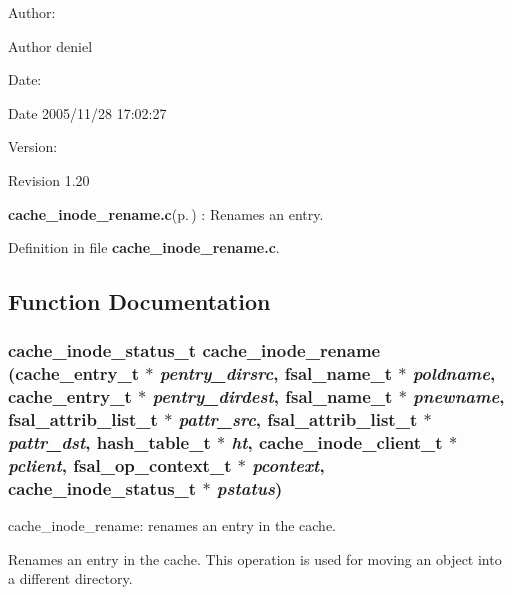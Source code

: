\begin{Desc}
\item[Author:]\begin{Desc}
\item[Author]deniel \end{Desc}
\end{Desc}
\begin{Desc}
\item[Date:]\begin{Desc}
\item[Date]2005/11/28 17:02:27 \end{Desc}
\end{Desc}
\begin{Desc}
\item[Version:]\begin{Desc}
\item[Revision]1.20 \end{Desc}
\end{Desc}
{\bf cache\_\-inode\_\-rename.c}{\rm (p.\,\pageref{cache__inode__rename_8c})} : Renames an entry.

Definition in file {\bf cache\_\-inode\_\-rename.c}.

\subsection{Function Documentation}
\subsubsection{\setlength{\rightskip}{0pt plus 5cm}cache\_\-inode\_\-status\_\-t cache\_\-inode\_\-rename (cache\_\-entry\_\-t $\ast$ {\em pentry\_\-dirsrc}, fsal\_\-name\_\-t $\ast$ {\em poldname}, cache\_\-entry\_\-t $\ast$ {\em pentry\_\-dirdest}, fsal\_\-name\_\-t $\ast$ {\em pnewname}, fsal\_\-attrib\_\-list\_\-t $\ast$ {\em pattr\_\-src}, fsal\_\-attrib\_\-list\_\-t $\ast$ {\em pattr\_\-dst}, hash\_\-table\_\-t $\ast$ {\em ht}, cache\_\-inode\_\-client\_\-t $\ast$ {\em pclient}, fsal\_\-op\_\-context\_\-t $\ast$ {\em pcontext}, cache\_\-inode\_\-status\_\-t $\ast$ {\em pstatus})}\label{cache__inode__rename_8c_a1}


cache\_\-inode\_\-rename: renames an entry in the cache.

Renames an entry in the cache. This operation is used for moving an object into a different directory.

